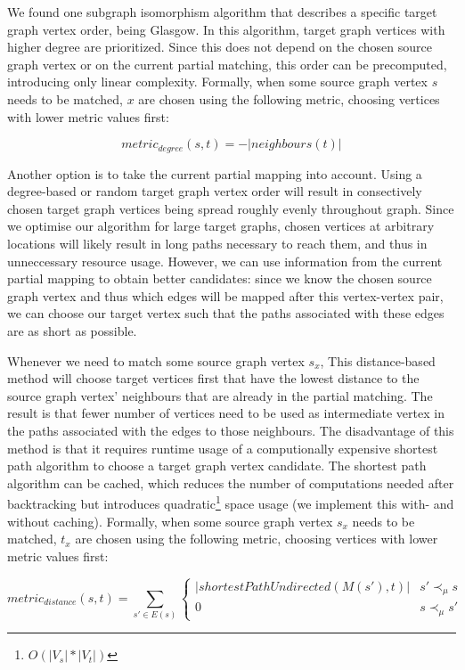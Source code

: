 We found one subgraph isomorphism algorithm that describes a specific target graph vertex order, being Glasgow\cite{McCreesh2015}. In this algorithm, target graph vertices with higher degree are prioritized. Since this does not depend on the chosen source graph vertex or on the current partial matching, this order can be precomputed, introducing only linear complexity. Formally, when some source graph vertex $s$ needs to be matched, $x$ are chosen using the following metric, choosing vertices with lower metric values first:

$$\mathit{metric}_\mathit{degree}(s, t)=-|\mathit{neighbours}(t)|$$

Another option is to take the current partial mapping into account. Using a degree-based or random target graph vertex order will result in consectively chosen target graph vertices being spread roughly evenly throughout graph. Since we optimise our algorithm for large target graphs, chosen vertices at arbitrary locations will likely result in long paths necessary to reach them, and thus in unneccessary resource usage. However, we can use information from the current partial mapping to obtain better candidates: since we know the chosen source graph vertex and thus which edges will be mapped after this vertex-vertex pair, we can choose our target vertex such that the paths associated with these edges are as short as possible.

Whenever we need to match some source graph vertex $s_x$, This distance-based method will choose target vertices first that have the lowest distance to the source graph vertex' neighbours that are already in the partial matching. The result is that fewer number of vertices need to be used as intermediate vertex in the paths associated with the edges to those neighbours. The disadvantage of this method is that it requires runtime usage of a computionally expensive shortest path algorithm to choose a target graph vertex candidate. The shortest path algorithm can be cached, which reduces the number of computations needed after backtracking but introduces quadratic\footnote{$O(|V_s|*|V_t|)$} space usage (we implement this with- and without caching). Formally, when some source graph vertex $s_x$ needs to be matched, $t_x$ are chosen using the following metric, choosing vertices with lower metric values first:


$$\mathit{metric}_\mathit{distance}(s, t)=\sum_{s' \in E(s)} \begin{cases}
|\mathit{shortestPathUndirected}(M(s'), t)| & s' \prec_\mu s\\
0 & s \prec_\mu s'
\end{cases}$$

